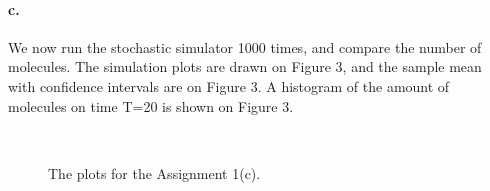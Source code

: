 \documentclass[a4paper,english]{article}
\begin{document}
\paragraph{c.}

We now run the stochastic simulator 1000 times, and compare the number of molecules. The simulation plots are drawn on Figure 3, and the sample mean with confidence intervals are on Figure 3. A histogram of the amount of molecules on time T=20 is shown on Figure 3.


\begin{figure}[htp]
  \centering

  \\
  \caption{The plots for the Assignment 1(c).}\label{fig:sim}
  
\end{figure}
\end{document}
